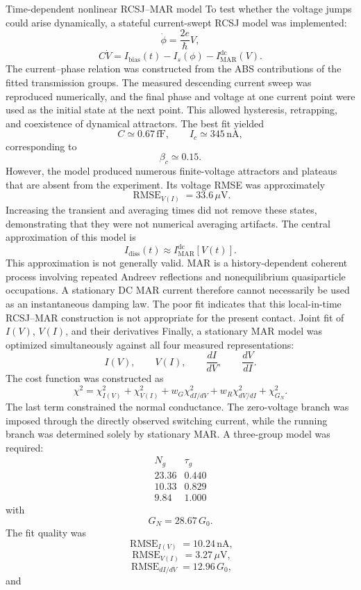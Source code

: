 Time-dependent nonlinear RCSJ–MAR model
To test whether the voltage jumps could arise dynamically, a stateful current-swept RCSJ model was implemented:
\[
\dot\phi=\frac{2e}{\hbar}V,
\]\[
C\dot V
=
I_{\mathrm{bias}}(t)
-I_s(\phi)
-I_{\mathrm{MAR}}^{\mathrm{dc}}(V).
\]The current–phase relation was constructed from the ABS contributions of the fitted transmission groups. The measured descending current sweep was reproduced numerically, and the final phase and voltage at one current point were used as the initial state at the next point. This allowed hysteresis, retrapping, and coexistence of dynamical attractors.
The best fit yielded
\[
C\simeq0.67\,\mathrm{fF},
\qquad
I_c\simeq345\,\mathrm{nA},
\]corresponding to
\[
\beta_c\simeq0.15.
\]However, the model produced numerous finite-voltage attractors and plateaus that are absent from the experiment. Its voltage RMSE was approximately
\[
\operatorname{RMSE}_{V(I)}
=
33.6\,\mu\mathrm V.
\]Increasing the transient and averaging times did not remove these states, demonstrating that they were not numerical averaging artifacts.
The central approximation of this model is
\[
I_{\mathrm{diss}}(t)
\approx
I_{\mathrm{MAR}}^{\mathrm{dc}}[V(t)].
\]This approximation is not generally valid. MAR is a history-dependent coherent process involving repeated Andreev reflections and nonequilibrium quasiparticle occupations. A stationary DC MAR current therefore cannot necessarily be used as an instantaneous damping law. The poor fit indicates that this local-in-time RCSJ–MAR construction is not appropriate for the present contact.
Joint fit of \(I(V)\), \(V(I)\), and their derivatives
Finally, a stationary MAR model was optimized simultaneously against all four measured representations:
\[
I(V),\qquad
V(I),\qquad
\frac{dI}{dV},\qquad
\frac{dV}{dI}.
\]The cost function was constructed as
\[
\chi^2
=
\chi^2_{I(V)}
+
\chi^2_{V(I)}
+
w_G\chi^2_{dI/dV}
+
w_R\chi^2_{dV/dI}
+
\chi^2_{G_N}.
\]The last term constrained the normal conductance. The zero-voltage branch was imposed through the directly observed switching current, while the running branch was determined solely by stationary MAR.
A three-group model was required:
\[
\begin{array}{c|c}
N_g & \tau_g\\ \hline
23.36 & 0.440\\
10.33 & 0.829\\
9.84 & 1.000
\end{array}
\]with
\[
G_N=28.67\,G_0.
\]The fit quality was
\[
\operatorname{RMSE}_{I(V)}
=
10.24\,\mathrm{nA},
\]\[
\operatorname{RMSE}_{V(I)}
=
3.27\,\mu\mathrm V,
\]\[
\operatorname{RMSE}_{dI/dV}
=
12.96\,G_0,
\]and
